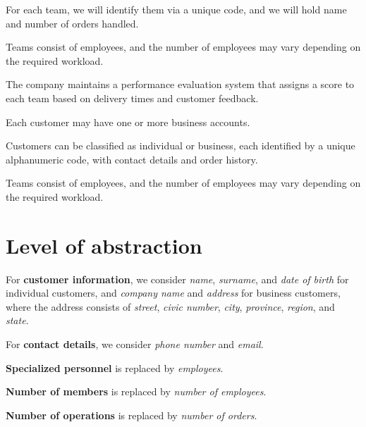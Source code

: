 \begin{tcolorbox}[title=Phrases related to Teams]
For each team, we will identify them via a unique code, and we will hold name and number of orders handled.  

Teams consist of employees, and the number of employees may vary depending on the required workload.  

The company maintains a performance evaluation system that assigns a score to each team based on delivery times and customer feedback.
\end{tcolorbox}

\begin{tcolorbox}[title=Phrases related to Customers]
Each customer may have one or more business accounts.  

Customers can be classified as individual or business, each identified by a unique alphanumeric code, with contact details and order history.
\end{tcolorbox}

\begin{tcolorbox}[title=Phrases related to Employees]
Teams consist of employees, and the number of employees may vary depending on the required workload.
\end{tcolorbox}

\section*{Level of abstraction}
For \textbf{customer information}, we consider \textit{name}, \textit{surname}, and \textit{date of birth} for individual customers, and \textit{company name} and \textit{address} for business customers, where the address consists of \textit{street}, \textit{civic number}, \textit{city}, \textit{province}, \textit{region}, and \textit{state}.  

For \textbf{contact details}, we consider \textit{phone number} and \textit{email}.  

\textbf{Specialized personnel} is replaced by \textit{employees}.  

\textbf{Number of members} is replaced by \textit{number of employees}.  

\textbf{Number of operations} is replaced by \textit{number of orders}.

